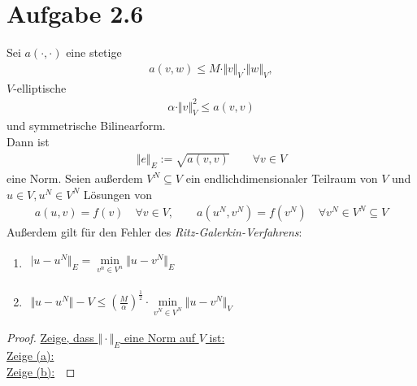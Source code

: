 \documentclass[12pt,a4paper]{article}
\begin{document}
\section*{Aufgabe 2.6}
Sei $a(\cdot,\cdot)$ eine stetige
\begin{align*}
a(v,w)\leq M\cdot\Vert v\Vert_V\cdot\Vert w\Vert_V,
\end{align*}
$V$-elliptische
\begin{align*}
\alpha\cdot\Vert v\Vert^2_V\leq a(v,v)
\end{align*}
und symmetrische Bilinearform.\\
Dann ist
\begin{align*}
\Vert e\Vert_E:=\sqrt{a(v,v)}\qquad\forall v\in V
\end{align*}
eine Norm. Seien außerdem $V^N\subseteq V$ ein endlichdimensionaler Teilraum von $V$ und $u\in V,u^N\in V^N$ Lösungen von
\begin{align*}
a(u,v)=f(v)\quad\forall v\in V,\qquad a(u^N,v^N)=f(v^N)\quad\forall v^N\in V^N\subseteq V
\end{align*}
Außerdem gilt für den Fehler des \textit{Ritz-Galerkin-Verfahrens}:
\begin{enumerate}[label=(\alph*)]
\item $\begin{aligned}
\vert u-u^N\Vert_E=\min\limits_{v^n\in V^n}\Vert u-v^N\Vert_E
\end{aligned}$
\item $\begin{aligned}
\Vert u-u^N\Vert-V\leq\left(\frac{M}{\alpha}\right)^{\frac{1}{2}}\cdot\min\limits_{v^N\in V^N}\Vert u-v^N\Vert_V
\end{aligned}$
\end{enumerate}
\begin{proof}
\underline{Zeige, dass $\Vert\cdot\Vert_E$ eine Norm auf $V$ ist:}\\

\underline{Zeige (a):}\\

\underline{Zeige (b):}\
\end{proof}
\end{document}
